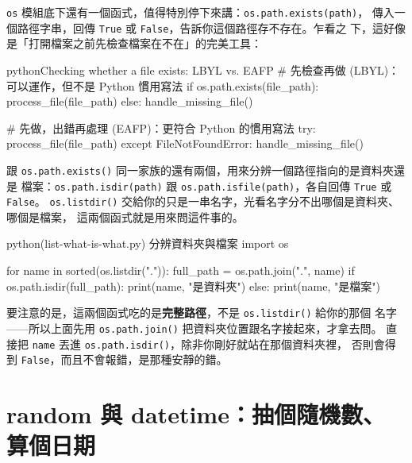 \texttt{os} 模組底下還有一個函式，值得特別停下來講：\texttt{os.path.exists(path)}，
傳入一個路徑字串，回傳 \texttt{True} 或 \texttt{False}，告訴你這個路徑存不存在。乍看之
下，這好像是「打開檔案之前先檢查檔案在不在」的完美工具：

\begin{code}{python}{Checking whether a file exists: LBYL vs. EAFP}
# 先檢查再做 (LBYL)：可以運作，但不是 Python 慣用寫法
if os.path.exists(file_path):
    process_file(file_path)
else:
    handle_missing_file()

# 先做，出錯再處理 (EAFP)：更符合 Python 的慣用寫法
try:
    process_file(file_path)
except FileNotFoundError:
    handle_missing_file()
\end{code}


跟 \texttt{os.path.exists()} 同一家族的還有兩個，用來分辨一個路徑指向的是資料夾還是
檔案：\texttt{os.path.isdir(path)} 跟 \texttt{os.path.isfile(path)}，各自回傳
\texttt{True} 或 \texttt{False}。
\texttt{os.listdir()} 交給你的只是一串名字，光看名字分不出哪個是資料夾、哪個是檔案，
這兩個函式就是用來問這件事的。

\begin{example}{python}{(list-what-is-what.py) 分辨資料夾與檔案}
import os

for name in sorted(os.listdir(".")):
    full_path = os.path.join(".", name)
    if os.path.isdir(full_path):
        print(name, "是資料夾")
    else:
        print(name, "是檔案")
\end{example}


要注意的是，這兩個函式吃的是\textbf{完整路徑}，不是 \texttt{os.listdir()} 給你的那個
名字——所以上面先用 \texttt{os.path.join()} 把資料夾位置跟名字接起來，才拿去問。
直接把 \texttt{name} 丟進 \texttt{os.path.isdir()}，除非你剛好就站在那個資料夾裡，
否則會得到 \texttt{False}，而且不會報錯，是那種安靜的錯。

\section{random 與 datetime：抽個隨機數、算個日期}
\label{sec:random-and-datetime}

